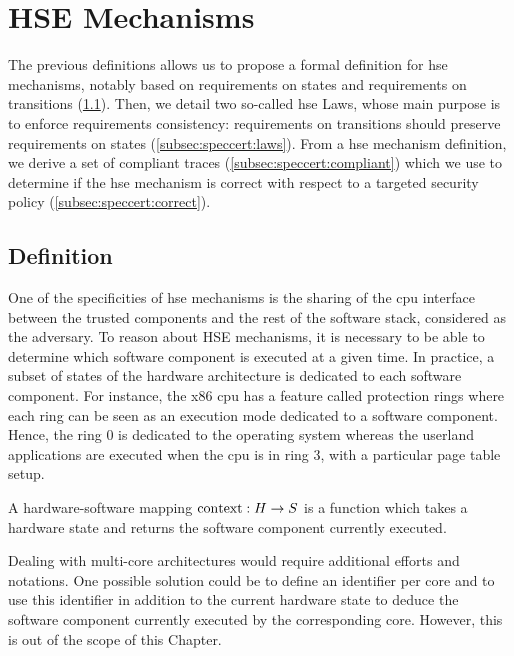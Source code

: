 \section{HSE Mechanisms}
\label{sec:speccert:hse}

The previous definitions allows us to propose a formal definition for \ac{hse}
mechanisms, notably based on requirements on states and requirements on
transitions (\ref{subsec:speccert:hsedef}).
%
Then, we detail two so-called \ac{hse} Laws, whose main purpose is to enforce
requirements consistency: requirements on transitions should preserve
requirements on states (\ref{subsec:speccert:laws}).
%
From a \ac{hse} mechanism definition, we derive a set of compliant traces
(\ref{subsec:speccert:compliant}) which we use to determine if the \ac{hse}
mechanism is correct with respect to a targeted security policy
(\ref{subsec:speccert:correct}).

\subsection{Definition}
\label{subsec:speccert:hsedef}

One of the specificities of \ac{hse} mechanisms is the sharing of the \ac{cpu}
interface between the trusted components and the rest of the software stack,
considered as the adversary.
%
To reason about HSE mechanisms, it is necessary to be able to determine which
software component is executed at a given time.
%
In practice, a subset of states of the hardware architecture is dedicated to
each software component.
%
For instance, the x86 \ac{cpu} has a feature called protection rings where each
ring can be seen as an execution mode dedicated to a software component.
%
Hence, the ring 0 is dedicated to the operating system whereas the userland
applications are executed when the \ac{cpu} is in ring 3, with a particular page
table setup.

\begin{definition}
  \label{def:hardsoftmap}
  A hardware-software mapping $\mathrm{con\-text} : H \rightarrow S$ is a function
  which takes a hardware state and returns the software component currently
  executed.
\end{definition}

Dealing with multi-core architectures would require additional efforts and
notations.
%
One possible solution could be to define an identifier per core and to use this
identifier in addition to the current hardware state to deduce the software
component currently executed by the corresponding core.
%
However, this is out of the scope of this Chapter.

